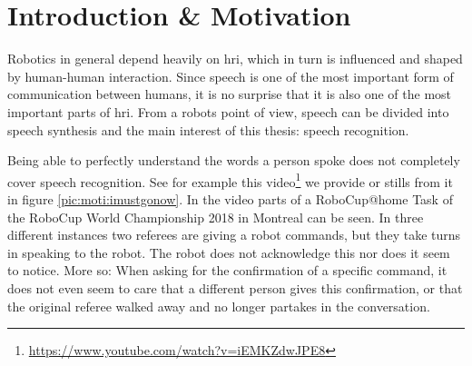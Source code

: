 
\chapter{Introduction \& Motivation}
\label{motiv:start}

Robotics in general depend heavily on \gls{hri}, which in turn is influenced and shaped by human-human interaction. %
Since speech is one of the most important form of communication between humans, it is no surprise that it is also one of the most important parts of \gls{hri}.
From a robots point of view, speech can be divided into speech synthesis and the main interest of this thesis: speech recognition.

Being able to perfectly understand the words a person spoke does not completely cover speech recognition.
See for example this video\footnote{\url{https://www.youtube.com/watch?v=iEMKZdwJPE8}} we provide or stills from it in figure \ref{pic:moti:imustgonow}.
In the video parts of a RoboCup@home Task of the RoboCup World Championship 2018 in Montreal can be seen.
In three different instances two referees are giving a robot commands, but they take turns in speaking to the robot.
The robot does not acknowledge this nor does it seem to notice.
More so: When asking for the confirmation of a specific command, it does not even seem to care that a different person gives this confirmation, or that the original referee walked away and no longer partakes in the conversation.

